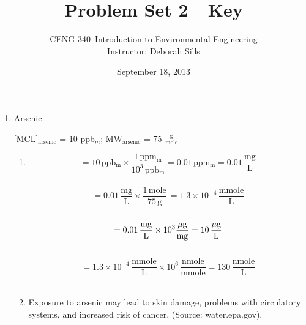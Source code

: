 \documentclass[12pt,letterpaper]{article}
\begin{document}
\setlength{\parindent}{0cm} 


\frenchspacing






\title {Problem Set 2---\textbf{Key}} 
\author {CENG 340--Introduction to Environmental Engineering\\
Instructor: Deborah Sills}
\date {September 18, 2013}
\maketitle

\begin{enumerate}

\item Arsenic

[MCL]$\mathrm{_{arsenic}}$ = 10 ppb$_m$; MW$\mathrm{_{arsenic}}$ = 75 $\mathrm{\frac{g}{mole}}$

\begin{enumerate}
\item
\begin{equation*}
[As] = \mathrm{10 \, ppb_m \times \frac{1\, ppm_m}{10^{3}\, ppb_m} = 0.01\, ppm_m = 0.01 \, \frac{mg}{L}}
\end{equation*}\\

\begin{equation*}
[As] = \mathrm{0.01 \, \frac{mg}{L}\times \frac{1 \, mole}{75\, g}\, = 1.3\times 10^{-4}\, \frac {mmole}{L}}
\end{equation*}\\

\begin{equation*}
[As] = \mathrm{0.01 \, \frac{mg}{L}\times 10^3 \frac{\mu g}{mg} = 10\, \frac{\mu g}{L}}\\
\end{equation*}\\

\begin{equation*}
[As] = \mathrm{1.3\times 10^{-4}\, \frac {mmole}{L}\times 10^6\, \frac{nmole}{mmole} = 130\, \frac{nmole}{L} }
\end{equation*}\\

\item Exposure to arsenic may lead to skin damage, problems with circulatory systems, and increased risk of cancer.  (Source: water.epa.gov).\\


\end{enumerate}
\end{enumerate}
\end{document}
